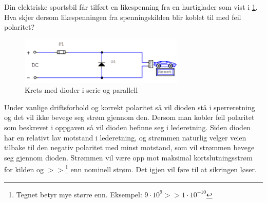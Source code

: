 \begin{question}[name=Spørsmål, topic=dioder]
Din elektriske sportsbil får tilført en likespenning fra en hurtiglader som vist i \ref{fig:diodeLading}. Hva skjer dersom likespenningen fra spenningskilden blir koblet til med feil polaritet?
	
	\begin{figure}[H]
		\centering
		\includegraphics[width=0.7\textwidth]{diode/figurer/DiodeLading.png}
		\caption{Krets med dioder i serie og parallell}
		\label{fig:diodeLading}
	\end{figure}
	
\end{question}


\begin{solution}[name=Løsningsforslag oppgave]
Under vanlige driftsforhold og korrekt polaritet så vil dioden stå i sperreretning og det vil ikke bevege seg strøm gjennom den. Dersom man kobler feil polaritet som beskrevet i oppgaven så vil dioden befinne seg i lederetning. Siden dioden har en relativt lav motstand i lederetning, og strømmen naturlig velger veien tilbake til den negativ polaritet med minst motstand, som vil strømmen bevege seg gjennom dioden. Strømmen vil være opp mot maksimal kortslutningsstrøm for kilden og $>>$\footnote{Tegnet betyr mye større enn. Eksempel: $9\cdot10^{9}>>1\cdot10^{-10}$} enn nominell strøm. Det igjen vil føre til at sikringen løser.
	
\end{solution}

